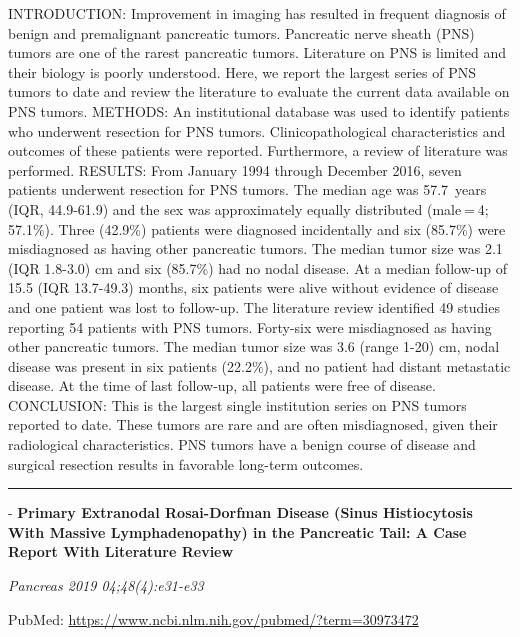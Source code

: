 \documentclass[]{article}
\begin{document}
INTRODUCTION: Improvement in imaging has resulted in frequent diagnosis
of benign and premalignant pancreatic tumors. Pancreatic nerve sheath
(PNS) tumors are one of the rarest pancreatic tumors. Literature on PNS
is limited and their biology is poorly understood. Here, we report the
largest series of PNS tumors to date and review the literature to
evaluate the current data available on PNS tumors. METHODS: An
institutional database was used to identify patients who underwent
resection for PNS tumors. Clinicopathological characteristics and
outcomes of these patients were reported. Furthermore, a review of
literature was performed. RESULTS: From January 1994 through December
2016, seven patients underwent resection for PNS tumors. The median age
was 57.7~years (IQR, 44.9-61.9) and the sex was approximately equally
distributed (male = 4; 57.1\%). Three (42.9\%) patients were diagnosed
incidentally and six (85.7\%) were misdiagnosed as having other
pancreatic tumors. The median tumor size was 2.1 (IQR 1.8-3.0) cm and
six (85.7\%) had no nodal disease. At a median follow-up of 15.5 (IQR
13.7-49.3) months, six patients were alive without evidence of disease
and one patient was lost to follow-up. The literature review identified
49 studies reporting 54 patients with PNS tumors. Forty-six were
misdiagnosed as having other pancreatic tumors. The median tumor size
was 3.6 (range 1-20) cm, nodal disease was present in six patients
(22.2\%), and no patient had distant metastatic disease. At the time of
last follow-up, all patients were free of disease. CONCLUSION: This is
the largest single institution series on PNS tumors reported to date.
These tumors are rare and are often misdiagnosed, given their
radiological characteristics. PNS tumors have a benign course of disease
and surgical resection results in favorable long-term outcomes.

{}

{}

\begin{center}\rule{0.5\linewidth}{\linethickness}\end{center}

 - \textbf{Primary Extranodal Rosai-Dorfman Disease (Sinus Histiocytosis
With Massive Lymphadenopathy) in the Pancreatic Tail: A Case Report With
Literature Review}

\emph{Pancreas 2019 04;48(4):e31-e33}

PubMed: \url{https://www.ncbi.nlm.nih.gov/pubmed/?term=30973472}

{}
\end{document}
